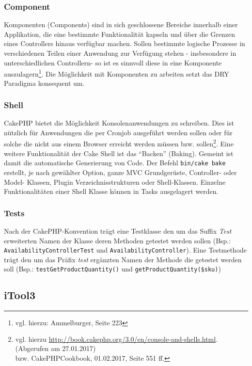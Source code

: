 	\subsubsection{Component}
	Komponenten (Components) sind in sich geschlossene Bereiche innerhalb einer Applikation, die eine bestimmte Funktionalität kapseln und über die Grenzen eines Controllers hinaus verfügbar machen. Sollen bestimmte logische Prozesse in verschiedenen Teilen einer Anwendung zur Verfügung stehen - insbesondere in unterschiedlichen Controllern- so ist es sinnvoll diese in eine Komponente auszulagern\footnote{vgl. hierzu: Ammelburger, Seite 223}.
	Die Möglichkeit mit Komponenten zu arbeiten setzt das DRY Paradigma konsequent um.
	
	\subsubsection{Shell}	%
	CakePHP bietet die Möglichkeit Konsolenanwendungen zu schreiben. Dies ist nützlich für Anwendungen die per Cronjob ausgeführt werden sollen oder für solche die nicht aus einem Browser erreicht werden müssen bzw. sollen\footnote{vgl. hierzu \url{http://book.cakephp.org/3.0/en/console-and-shells.html}.(Abgerufen am 27.01.2017) \\bzw. CakePHPCookbook, 01.02.2017, Seite 551 ff.}. 
	Eine weitere Funktionalität der Cake Shell ist das \enquote{Backen} (Baking). Gemeint ist damit die automatische Generierung von Code. Der Befehl \texttt{bin/cake bake} erstellt, je nach gewählter Option, ganze MVC Grundgerüste, Controller- oder Model- Klassen, Plugin Verzeichnisstrukturen oder Shell-Klassen. Einzelne Funktionalitäten einer Shell Klasse können in Tasks ausgelagert werden.  
	
	\subsubsection{Tests}
	Nach der CakePHP-Konvention trägt eine Testklasse den um das Suffix \textit{Test} erweiterten Namen der Klasse deren Methoden getestet werden sollen (Bsp.: \texttt{AvailabilityControllerTest} und \texttt{AvailabilityController}).  Eine Testmethode trägt den um das Präfix \textit{test} ergänzten Namen der Methode die getestet werden soll (Bsp.: \texttt{testGetProductQuantity()} und \texttt{getProductQuantity(\$sku)})
	

	
	\subsection{iTool3}
	
